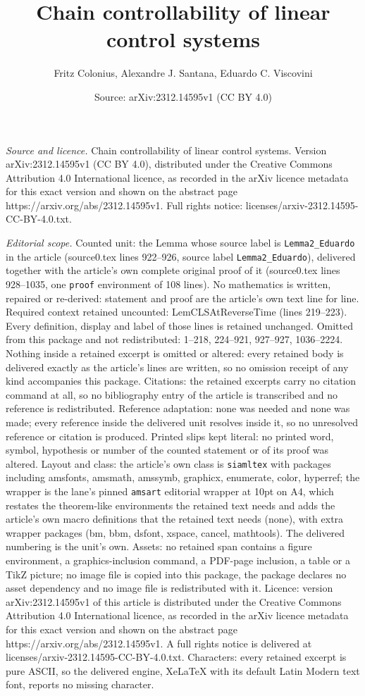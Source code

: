 \documentclass[10pt,a4paper]{amsart}
\title[Chain controllability of linear control systems]{Chain controllability of linear control systems}
\author{Fritz Colonius, Alexandre J. Santana, Eduardo C. Viscovini}
\date{Source: arXiv:2312.14595v1 (CC BY 4.0)}
\begin{document}
\maketitle

\noindent\emph{Source and licence.} Chain controllability of linear control systems. Version arXiv:2312.14595v1 (CC BY 4.0), distributed under the Creative Commons Attribution 4.0 International licence, as recorded in the arXiv licence metadata for this exact version and shown on the abstract page https://arxiv.org/abs/2312.14595v1. Full rights notice: licenses/arxiv-2312.14595-CC-BY-4.0.txt.\par\smallskip

\noindent\textit{Editorial scope.} Counted unit: the Lemma whose source label is \texttt{Lemma2\_Eduardo} in the article (source0.tex lines 922--926, source label \texttt{Lemma2\_Eduardo}), delivered together with the article's own complete original proof of it (source0.tex lines 928--1035, one \texttt{proof} environment of 108 lines). No mathematics is written, repaired or re-derived: statement and proof are the article's own text line for line. Required context retained uncounted: LemCLSAtReverseTime (lines 219--223). Every definition, display and label of those lines is retained unchanged. Omitted from this package and not redistributed: 1--218, 224--921, 927--927, 1036--2224. Nothing inside a retained excerpt is omitted or altered: every retained body is delivered exactly as the article's lines are written, so no omission receipt of any kind accompanies this package. Citations: the retained excerpts carry no citation command at all, so no bibliography entry of the article is transcribed and no reference is redistributed. Reference adaptation: none was needed and none was made; every reference inside the delivered unit resolves inside it, so no unresolved reference or citation is produced. Printed slips kept literal: no printed word, symbol, hypothesis or number of the counted statement or of its proof was altered. Layout and class: the article's own class is \texttt{siamltex} with packages including amsfonts, amsmath, amssymb, graphicx, enumerate, color, hyperref; the wrapper is the lane's pinned \texttt{amsart} editorial wrapper at 10pt on A4, which restates the theorem-like environments the retained text needs and adds the article's own macro definitions that the retained text needs (none), with extra wrapper packages (bm, bbm, dsfont, xspace, cancel, mathtools). The delivered numbering is the unit's own. Assets: no retained span contains a figure environment, a graphics-inclusion command, a PDF-page inclusion, a table or a TikZ picture; no image file is copied into this package, the package declares no asset dependency and no image file is redistributed with it. Licence: version arXiv:2312.14595v1 of this article is distributed under the Creative Commons Attribution 4.0 International licence, as recorded in the arXiv licence metadata for this exact version and shown on the abstract page https://arxiv.org/abs/2312.14595v1. A full rights notice is delivered at licenses/arxiv-2312.14595-CC-BY-4.0.txt. Characters: every retained excerpt is pure ASCII, so the delivered engine, XeLaTeX with its default Latin Modern text font, reports no missing character.
\end{document}
